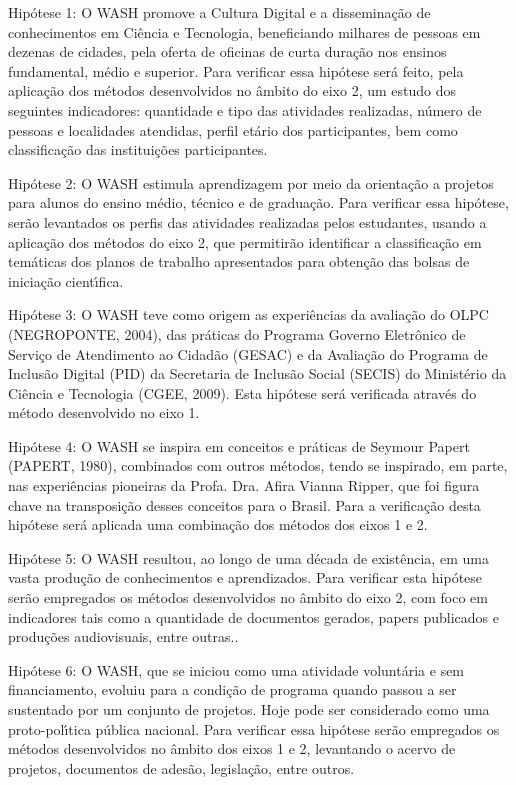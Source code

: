 \documentclass[
12pt,		%
openright,	%
twoside,  %
a4paper,			%
chapter=TITLE,		%
english,			%
french,				%
spanish,			%
brazil				%
]{USPSC-classe/USPSC}
\begin{document}
\begin{alineas}
\item Hip\'otese 1: O WASH promove a Cultura Digital e a dissemina\c{c}\~ao de conhecimentos em Ci\^encia e Tecnologia, beneficiando milhares de pessoas em dezenas de cidades, pela oferta de oficinas de curta dura\c{c}\~ao nos ensinos fundamental, m\'edio e superior. Para verificar essa hip\'otese ser\'a feito, pela aplica\c{c}\~ao dos m\'etodos desenvolvidos no \^ambito do eixo 2, um estudo dos seguintes indicadores: quantidade e  tipo das atividades realizadas, n\'umero de pessoas e localidades atendidas, perfil et\'ario dos participantes, bem como classifica\c{c}\~ao das institui\c{c}\~oes participantes.
\item Hip\'otese 2: O WASH estimula aprendizagem por meio da orienta\c{c}\~ao a projetos para alunos do ensino m\'edio, t\'ecnico e de gradua\c{c}\~ao. Para verificar essa hip\'otese, ser\~ao levantados os perfis das atividades realizadas pelos estudantes, usando a aplica\c{c}\~ao dos m\'etodos do eixo 2, que permitir\~ao identificar a classifica\c{c}\~ao em tem\'aticas dos planos de trabalho apresentados para obten\c{c}\~ao das bolsas de inicia\c{c}\~ao cient\'{\i}fica.
\item Hip\'otese 3: O WASH teve como origem as experi\^encias da avalia\c{c}\~ao do OLPC (NEGROPONTE, 2004), das pr\'aticas do Programa Governo Eletr\^onico de Servi\c{c}o de Atendimento ao Cidad\~ao (GESAC) e da Avalia\c{c}\~ao do Programa de Inclus\~ao Digital (PID) da Secretaria de Inclus\~ao Social (SECIS) do Minist\'erio da Ci\^encia e Tecnologia (CGEE, 2009). Esta hip\'otese ser\'a verificada atrav\'es do m\'etodo desenvolvido no eixo 1.
\item Hip\'otese 4: O WASH se inspira em conceitos e pr\'aticas de Seymour Papert (PAPERT, 1980), combinados com outros m\'etodos, tendo se inspirado, em parte, nas experi\^encias pioneiras da Profa. Dra. Afira Vianna Ripper, que foi figura chave na transposi\c{c}\~ao desses conceitos para o Brasil. Para a verifica\c{c}\~ao desta hip\'otese ser\'a aplicada uma combina\c{c}\~ao dos m\'etodos dos eixos 1 e 2.
\item Hip\'otese 5: O WASH resultou, ao longo de uma d\'ecada de exist\^encia, em uma vasta produ\c{c}\~ao de conhecimentos e aprendizados. Para verificar esta hip\'otese ser\~ao empregados os m\'etodos desenvolvidos no \^ambito do eixo 2, com foco em indicadores tais como a quantidade de documentos gerados, papers publicados e produ\c{c}\~oes audiovisuais, entre outras..
\item Hip\'otese 6: O WASH, que se iniciou como uma atividade volunt\'aria e sem financiamento, evoluiu para a condi\c{c}\~ao de programa quando passou a ser sustentado por um conjunto de projetos. Hoje pode ser considerado como uma proto-pol\'{\i}tica p\'ublica nacional. Para verificar essa hip\'otese ser\~ao empregados os m\'etodos desenvolvidos no \^ambito dos eixos 1 e 2, levantando o acervo de projetos, documentos de ades\~ao, legisla\c{c}\~ao, entre outros.

\end{alineas}
\end{document}
